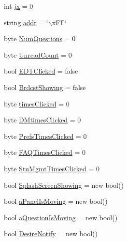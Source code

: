 \begin{DoxyCompactItemize}
int \hyperlink{class_sr_p___classroom_inq_1_1frm_classrrom_inq_a6206484c9b4d5d7558f8904cad77cded}{jx} = 0
\item 
string \hyperlink{class_sr_p___classroom_inq_1_1frm_classrrom_inq_ab99245163109493292f36ab5011c4f76}{addr} = \char`\"{}$\backslash$x\-F\-F\char`\"{}
\item 
byte \hyperlink{class_sr_p___classroom_inq_1_1frm_classrrom_inq_a7e4d497088afdd32623b3b54749210a0}{\-Num\-Questions} = 0
\item 
byte \hyperlink{class_sr_p___classroom_inq_1_1frm_classrrom_inq_a9978aff45fb1057f102e224f8485f096}{\-Unread\-Count} = 0
\item 
bool \hyperlink{class_sr_p___classroom_inq_1_1frm_classrrom_inq_a2f126b875f216c20427f6818976a9465}{\-E\-D\-T\-Clicked} = false
\item 
bool \hyperlink{class_sr_p___classroom_inq_1_1frm_classrrom_inq_a03327a44c502ac413d982a79dce5483c}{\-Brdcst\-Showing} = false
\item 
byte \hyperlink{class_sr_p___classroom_inq_1_1frm_classrrom_inq_a8b01f872cc35c75e41502f5114a65b74}{times\-Clicked} = 0
\item 
byte \hyperlink{class_sr_p___classroom_inq_1_1frm_classrrom_inq_a595a5c6942aa919d47de2b3e20f5f5bc}{\-D\-Mtimes\-Clicked} = 0
\item 
byte \hyperlink{class_sr_p___classroom_inq_1_1frm_classrrom_inq_a649306fdbca853561ee4a6cac829315a}{\-Prefs\-Times\-Clicked} = 0
\item 
byte \hyperlink{class_sr_p___classroom_inq_1_1frm_classrrom_inq_a81d1b27ebc720a6da339e1816eab4dfa}{\-F\-A\-Q\-Times\-Clicked} = 0
\item 
byte \hyperlink{class_sr_p___classroom_inq_1_1frm_classrrom_inq_a8746b34d859922daf9b2d5b00cef317e}{\-Stu\-Mgmt\-Times\-Clicked} = 0
\item 
bool \hyperlink{class_sr_p___classroom_inq_1_1frm_classrrom_inq_a7e52871d9da2c0a9364fd22a8743d7bd}{\-Splash\-Screen\-Showing} = new bool()
\item 
bool \hyperlink{class_sr_p___classroom_inq_1_1frm_classrrom_inq_ac17e540d0c6f7127a478c861290c883c}{a\-Panel\-Is\-Moving} = new bool()
\item 
bool \hyperlink{class_sr_p___classroom_inq_1_1frm_classrrom_inq_a0dfd1fb64c081a1cb412164b6eabf30b}{a\-Question\-Is\-Moving} = new bool()
\item 
bool \hyperlink{class_sr_p___classroom_inq_1_1frm_classrrom_inq_a39e6b524ac1f9239b638d8c3fe0fca7e}{\-Desire\-Notify} = new bool()
\item 

\end{DoxyCompactItemize}
